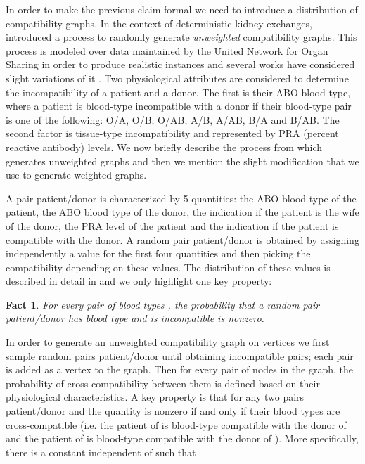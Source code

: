 \documentclass[12pt]{article}
\newtheorem{fact}{Fact}
\begin{document}
		In order to make the previous claim formal we need to introduce a distribution of compatibility graphs.	In the context of deterministic kidney exchanges, \cite{saidman} introduced a process to randomly generate \emph{unweighted} compatibility graphs. This process is modeled over data maintained by the United Network for Organ Sharing in order to produce realistic instances and several works have considered slight variations of it \cite{david,roth3,roth1,saidman,segev}. Two physiological attributes are considered to determine the incompatibility of a patient and a donor. The first is their ABO blood type, where a patient is blood-type incompatible with a donor if their blood-type pair is one of the following: O/A, O/B, O/AB, A/B, A/AB, B/A and B/AB. The second factor is tissue-type incompatibility and represented by PRA (percent reactive antibody) levels. We now briefly describe the process from \cite{saidman} which generates unweighted graphs and then we mention the slight modification that we use to generate weighted graphs. 
		
		A pair patient/donor is characterized by 5 quantities: the ABO blood type of the patient, the ABO blood type of the donor, the indication if the patient is the wife of the donor, the PRA level of the patient and the indication if the patient is compatible with the donor. A random pair patient/donor is obtained by assigning independently a value for the first four quantities and then picking the compatibility depending on these values. The distribution of these values is described in detail in \cite{saidman} and we only highlight one key property:
		
		\begin{fact}\label{prTypeInc}
			For every pair of blood types , the probability that a random pair patient/donor has blood type  and is incompatible is nonzero.
		\end{fact}
		
		In order to generate an unweighted compatibility graph on  vertices we first sample random pairs patient/donor until obtaining  incompatible pairs; each pair is added as a vertex to the graph. Then for every pair  of nodes in the graph, the probability  of cross-compatibility between them is defined based on their physiological characteristics. A key property is that for any two pairs patient/donor  and  the quantity  is nonzero if and only if their blood types are cross-compatible (i.e. the patient of  is blood-type compatible with the donor of  and the patient of  is blood-type compatible with the donor of ). More specifically, there is a constant  independent of  such that 
\end{document}
